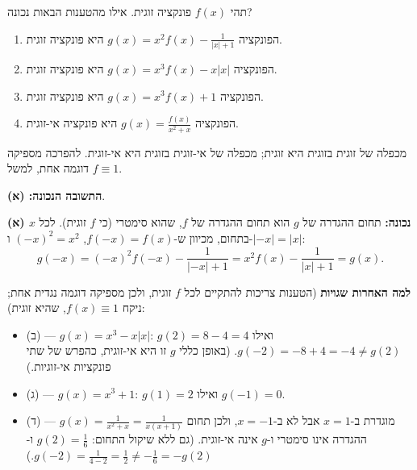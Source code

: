 
\begin{question}
תהי $f(x)$ פונקציה זוגית. אילו מהטענות הבאות נכונה?
\begin{enumerate}
  \item הפונקציה $g(x)=x^2f(x)-\frac{1}{|x|+1}$ היא פונקציה זוגית.
  \item הפונקציה $g(x)=x^3f(x)-x|x|$ היא פונקציה זוגית.
  \item הפונקציה $g(x)=x^3f(x)+1$ היא פונקציה זוגית.
  \item הפונקציה $g(x)=\frac{f(x)}{x^2+x}$ היא פונקציה אי-זוגית.
\end{enumerate}
\end{question}

\begin{hint}
מכפלה של זוגית בזוגית היא זוגית; מכפלה של אי-זוגית בזוגית היא אי-זוגית. להפרכה מספיקה דוגמה אחת, למשל $f\equiv1$.
\end{hint}

\begin{solution}
\textbf{התשובה הנכונה: (א)}.

\textbf{(א) נכונה:} תחום ההגדרה של $g$ הוא תחום ההגדרה של $f$, שהוא סימטרי (כי $f$ זוגית). לכל $x$ בתחום, מכיוון ש-$f(-x)=f(x)$, $(-x)^2=x^2$ ו-$|-x|=|x|$:
\[
g(-x)=(-x)^2f(-x)-\frac{1}{|-x|+1}=x^2f(x)-\frac{1}{|x|+1}=g(x).
\]

\textbf{למה האחרות שגויות} (הטענות צריכות להתקיים לכל $f$ זוגית, ולכן מספיקה דוגמה נגדית אחת; ניקח $f(x)\equiv1$, שהיא זוגית):
\begin{itemize}
  \item (ב) — $g(x)=x^3-x|x|$: $g(2)=8-4=4$ ואילו $g(-2)=-8+4=-4\neq g(2)$. (באופן כללי $g$ זו היא אי-זוגית, כהפרש של שתי פונקציות אי-זוגיות.)
  \item (ג) — $g(x)=x^3+1$: $g(1)=2$ ואילו $g(-1)=0$.
  \item (ד) — $g(x)=\frac{1}{x^2+x}=\frac{1}{x(x+1)}$ מוגדרת ב-$x=1$ אבל לא ב-$x=-1$, ולכן תחום ההגדרה אינו סימטרי ו-$g$ אינה אי-זוגית. (גם ללא שיקול התחום: $g(2)=\frac16$ ו-$g(-2)=\frac{1}{4-2}=\frac12\neq-\frac16=-g(2)$.)
\end{itemize}
\end{solution}
